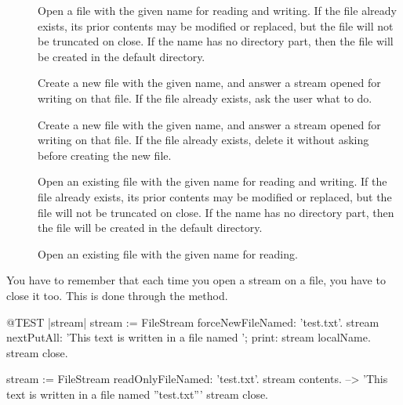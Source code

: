 \documentclass[a4paper,10pt,twoside]{book}
\begin{document}
\begin{description}

\item[] Open a file with the given name for reading and
  writing. If the file already exists, its prior contents may be
  modified or replaced, but the file will not be truncated on
  close. If the name has no directory part, then the file will be
  created in the default directory.
  
\item[] Create a new file with the given name,
  and answer a stream opened for writing on that file. If the file
  already exists, ask the user what to do.
  
\item[] Create a new file with the given
  name, and answer a stream opened for writing on that file. If the
  file already exists, delete it without asking before creating the
  new file.

\item[] Open an existing file with the given
  name for reading and writing. If the file already exists, its prior
  contents may be modified or replaced, but the file will not be
  truncated on close. If the name has no directory part, then the file
  will be created in the default directory.

\item[] Open an existing file with the
  given name for reading.

\end{description}

You have to remember that each time you open a stream on a file, you
have to close it too. This is done through the  method.

\begin{code}{@TEST |stream|}
stream := FileStream forceNewFileNamed: 'test.txt'.
stream
    nextPutAll: 'This text is written in a file named ';
    print: stream localName.
stream close.

stream := FileStream readOnlyFileNamed: 'test.txt'.
stream contents. --> 'This text is written in a file named ''test.txt'''
stream close.
\end{code}
\end{document}

